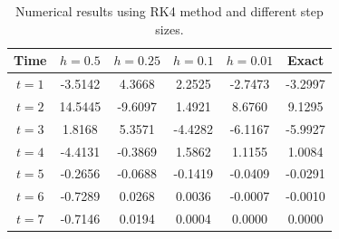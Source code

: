 \begin{table}[H]
\centering
\begin{tabular}{cccccc}
\hline
\textbf{Time}                          & \textbf{\boldmath$h=0.5$} & \textbf{\boldmath$h=0.25$} & \textbf{\boldmath$h=0.1$} & \textbf{\boldmath$h=0.01$} & \textbf{Exact} \\ \hline
\textbf{\boldmath$t=1$} & -3.5142                                  & 4.3668                                    & 2.2525                                   & -2.7473                                   & -3.2997        \\
\textbf{\boldmath$t=2$} & 14.5445                                  & -9.6097                                   & 1.4921                                   & 8.6760                                    & 9.1295         \\
\textbf{\boldmath$t=3$} & 1.8168                                   & 5.3571                                    & -4.4282                                  & -6.1167                                   & -5.9927        \\
\textbf{\boldmath$t=4$} & -4.4131                                  & -0.3869                                   & 1.5862                                   & 1.1155                                    & 1.0084         \\
\textbf{\boldmath$t=5$} & -0.2656                                  & -0.0688                                   & -0.1419                                  & -0.0409                                   & -0.0291        \\
\textbf{\boldmath$t=6$} & -0.7289                                  & 0.0268                                    & 0.0036                                   & -0.0007                                   & -0.0010        \\
\textbf{\boldmath$t=7$} & -0.7146                                  & 0.0194                                    & 0.0004                                   & 0.0000                                    & 0.0000         \\ \hline
\end{tabular}
\caption{Numerical results using RK4 method and different step sizes.}
\label{tab:ex3kutta}
\end{table}

